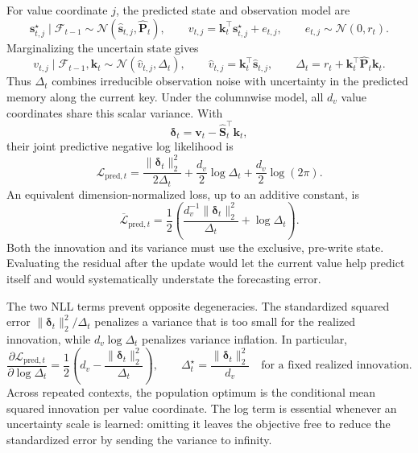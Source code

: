 \documentclass[11pt]{article}
\newcommand{\vct}[1]{\boldsymbol{#1}}
\begin{document}
For value coordinate $j$, the predicted state and observation model are
\begin{equation}
  \vct{s}_{t,j}^{\star}\mid\mathcal{F}_{t-1}
  \sim\mathcal{N}(\widehat{\vct{s}}_{t,j},\widehat{\vct{P}}_t),
  \qquad
  v_{t,j}=\vct{k}_t^\top\vct{s}_{t,j}^{\star}+e_{t,j},
  \qquad
  e_{t,j}\sim\mathcal{N}(0,r_t).
  \label{eq:discussion-predictive-nll-model}
\end{equation}
Marginalizing the uncertain state gives
\begin{equation}
  v_{t,j}\mid\mathcal{F}_{t-1},\vct{k}_t
  \sim\mathcal{N}(\widehat v_{t,j},\Delta_t),
  \qquad
  \widehat v_{t,j}=\vct{k}_t^\top\widehat{\vct{s}}_{t,j},
  \qquad
  \Delta_t=r_t+\vct{k}_t^\top\widehat{\vct{P}}_t\vct{k}_t.
  \label{eq:discussion-predictive-innovation-distribution}
\end{equation}
Thus $\Delta_t$ combines irreducible observation noise with uncertainty in the predicted memory
along the current key. Under the columnwise model, all $d_v$ value coordinates share this scalar
variance. With
\begin{equation}
  \vct{\delta}_t
  =\vct{v}_t-\widehat{\vct{S}}_t^\top\vct{k}_t,
  \label{eq:discussion-predictive-nll-innovation}
\end{equation}
their joint predictive negative log likelihood is
\begin{equation}
  \mathcal{L}_{\mathrm{pred},t}
  =\frac{\|\vct{\delta}_t\|_2^2}{2\Delta_t}
   +\frac{d_v}{2}\log\Delta_t
   +\frac{d_v}{2}\log(2\pi).
  \label{eq:discussion-predictive-innovation-nll}
\end{equation}
An equivalent dimension-normalized loss, up to an additive constant, is
\begin{equation}
  \overline{\mathcal{L}}_{\mathrm{pred},t}
  =\frac12\left(
    \frac{d_v^{-1}\|\vct{\delta}_t\|_2^2}{\Delta_t}
    +\log\Delta_t
  \right).
  \label{eq:discussion-predictive-innovation-nll-normalized}
\end{equation}
Both the innovation and its variance must use the exclusive, pre-write state. Evaluating the
residual after the update would let the current value help predict itself and would systematically
understate the forecasting error.

The two NLL terms prevent opposite degeneracies. The standardized squared error
$\|\vct{\delta}_t\|_2^2/\Delta_t$ penalizes a variance that is too small for the realized
innovation, while $d_v\log\Delta_t$ penalizes variance inflation. In particular,
\begin{equation}
  \frac{\partial\mathcal{L}_{\mathrm{pred},t}}
       {\partial\log\Delta_t}
  =\frac12\left(
    d_v-\frac{\|\vct{\delta}_t\|_2^2}{\Delta_t}
  \right),
  \qquad
  \Delta_t^{\star}
  =\frac{\|\vct{\delta}_t\|_2^2}{d_v}
  \quad\text{for a fixed realized innovation}.
  \label{eq:discussion-predictive-nll-optimum}
\end{equation}
Across repeated contexts, the population optimum is the conditional mean squared innovation per
value coordinate. The log term is essential whenever an uncertainty scale is learned: omitting it
leaves the objective free to reduce the standardized error by sending the variance to infinity.
\end{document}
